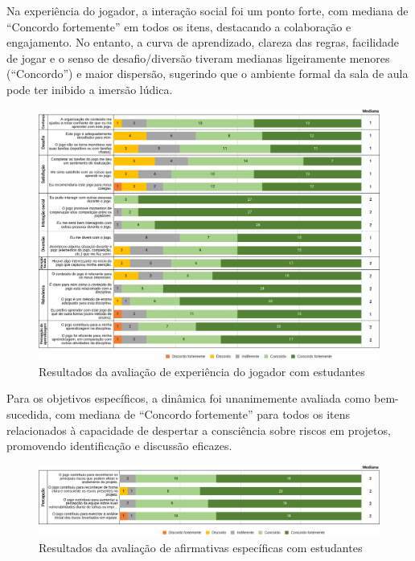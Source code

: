 \documentclass[12pt]{article}
\begin{document}
Na experiência do jogador, a interação social foi um ponto forte, com mediana de “Concordo fortemente” em todos os itens, destacando a colaboração e engajamento. No entanto, a curva de aprendizado, clareza das regras, facilidade de jogar e o senso de desafio/diversão tiveram medianas ligeiramente menores (“Concordo”) e maior dispersão, sugerindo que o ambiente formal da sala de aula pode ter inibido a imersão lúdica.

\begin{figure}[H]
	\caption{\label{ufsc-xp-jogador} Resultados da avaliação de experiência do jogador com estudantes}
  \includegraphics[width=\textwidth]{ufsc-xp-jogador}
\end{figure}

Para os objetivos específicos, a dinâmica foi unanimemente avaliada como bem-sucedida, com mediana de “Concordo fortemente” para todos os itens relacionados à capacidade de despertar a consciência sobre riscos em projetos, promovendo identificação e discussão eficazes.

\begin{figure}[H]
	\caption{\label{ufsc-afirmativas} Resultados da avaliação de afirmativas específicas com estudantes}
  \includegraphics[width=\textwidth]{ufsc-afirmativas}
\end{figure}
\end{document}
